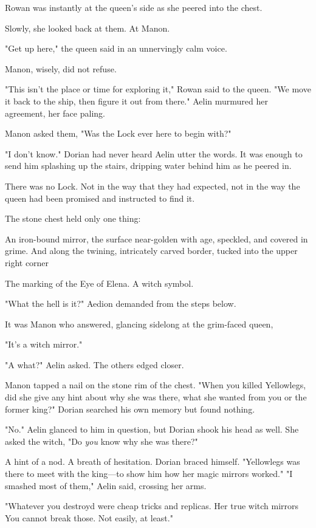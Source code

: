 Rowan was instantly at the queen's side as she peered into the chest.

Slowly, she looked back at them. At Manon.

"Get up here," the queen said in an unnervingly calm voice.

Manon, wisely, did not refuse.

"This isn't the place or time for exploring it," Rowan said to the queen. "We move it back to the ship, then figure it out from there." Aelin murmured her agreement, her face paling.

Manon asked them, "Was the Lock ever here to begin with?"

"I don't know." Dorian had never heard Aelin utter the words. It was enough to send him splashing up the stairs, dripping water behind him as he peered in.

There was no Lock. Not in the way that they had expected, not in the way the queen had been promised and instructed to find it.

The stone chest held only one thing:

An iron-bound mirror, the surface near-golden with age, speckled, and covered in grime. And along the twining, intricately carved border, tucked into the upper right corner 

The marking of the Eye of Elena. A witch symbol.

"What the hell is it?" Aedion demanded from the steps below.

It was Manon who answered, glancing sidelong at the grim-faced queen,

"It's a witch mirror."

"A what?" Aelin asked. The others edged closer.

Manon tapped a nail on the stone rim of the chest. "When you killed Yellowlegs, did she give any hint about why she was there, what she wanted from you or the former king?" Dorian searched his own memory but found nothing.

"No." Aelin glanced to him in question, but Dorian shook his head as well. She asked the witch, "Do \emph{you} know why she was there?"

A hint of a nod. A breath of hesitation. Dorian braced himself. "Yellowlegs was there to meet with the king---to show him how her magic mirrors worked." "I smashed most of them," Aelin said, crossing her arms.

"Whatever you destroyd were cheap tricks and replicas. Her true witch mirrors  You cannot break those. Not easily, at least."

